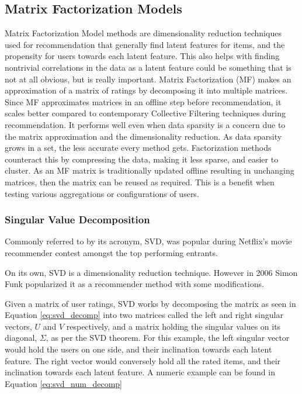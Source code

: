 \subsection{Matrix Factorization Models} \label{bg:sub:factorizationmodels}
Matrix Factorization Model methods are dimensionality reduction techniques used for recommendation that generally find latent features for items, and the propensity for users towards each latent feature. This also helps with finding nontrivial correlations in the data as a latent feature could be something that is not at all obvious, but is really important.
Matrix Factorization (MF) makes an approximation of a matrix of ratings by decomposing it into multiple matrices. Since MF approximates matrices in an offline step before recommendation, it scales better compared to contemporary Collective Filtering techniques during recommendation. It performs well even when data sparsity is a concern due to the matrix approximation and the dimensionality reduction.
As data sparsity grows in a set, the less accurate every method gets. Factorization methods counteract this by compressing the data, making it less sparse, and easier to cluster.
As an MF matrix is traditionally updated offline resulting in unchanging matrices, then the matrix can be reused as required. This is a benefit when testing various aggregations or configurations of users.

\subsubsection{Singular Value Decomposition}
Commonly referred to by its acronym, SVD, was popular during Netflix's movie recommender contest amongst the top performing entrants.

On its own, SVD is a dimensionality reduction technique. However in 2006 Simon Funk \cite{svdsimonfunk} popularized it as a recommender method with some modifications.

Given a matrix of user ratings, SVD works by decomposing the matrix as seen in Equation \ref{eq:svd_decomp} into two matrices called the left and right singular vectors, $U$ and $V$ respectively, and a matrix holding the singular values on its diagonal, $\Sigma$, as per the SVD theorem\cite{svdtheorem}. For this example, the left singular vector would hold the users on one side, and their inclination towards each latent feature. The right vector would conversely hold all the rated items, and their inclination towards each latent feature. A numeric example can be found in Equation \ref{eq:svd_num_decomp}

